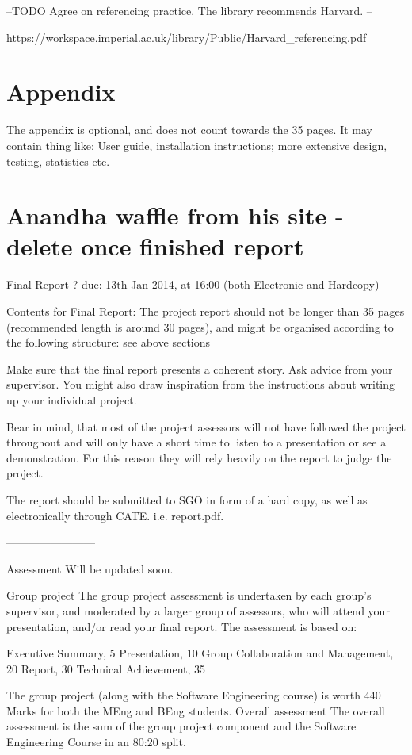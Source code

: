 \documentclass[a4wide, 11pt]{article}
\begin{document}
\printbibliography

--TODO Agree on referencing practice. The library recommends Harvard. --

https://workspace.imperial.ac.uk/library/Public/Harvard\_referencing.pdf

\section{Appendix}

The appendix is optional, and does not count towards the 35 pages. It may contain thing like: User guide, installation instructions; more extensive design, testing, statistics etc.

\section{Anandha waffle from his site - delete once finished report}

Final Report ? due: 13th Jan 2014, at 16:00 (both Electronic and Hardcopy)

Contents for Final Report: The project report should not be longer than 35 pages (recommended length is around 30 pages), and might be organised according to the following structure: see above sections

Make sure that the final report presents a coherent story. Ask advice from your supervisor. You might also draw inspiration from the instructions about writing up your individual project.

Bear in mind, that most of the project assessors will not have followed the project throughout and will only have a short time to listen to a presentation or see a demonstration. For this reason they will rely heavily on the report to judge the project.

The report should be submitted to SGO in form of a hard copy, as well as electronically through CATE. i.e. report.pdf. 

------------------------

Assessment
Will be updated soon.

Group project
The group project assessment is undertaken by each group's supervisor, and moderated by a larger group of assessors, who will attend your presentation, and/or read your final report. The assessment is based on:

    Executive Summary, 5
    Presentation, 10
    Group Collaboration and Management, 20
    Report, 30
    Technical Achievement, 35

The group project (along with the Software Engineering course) is worth 440 Marks for both the MEng and BEng students.
Overall assessment
The overall assessment is the sum of the group project component and the Software Engineering Course in an 80:20 split. 
\end{document}
